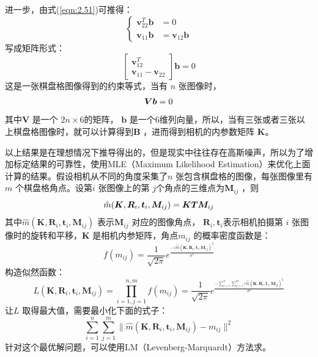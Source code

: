 进一步，由式(\ref{eqn:2.51})可推得：
\begin{equation}
\label{eqn:2.59}
\left\{
\begin{aligned} 
\bm{v}_{22}^T \bm{b} &= 0 \\ 
\bm{v}_{11} \bm{b} &= \bm{v}_{12} \bm{b} 
\end{aligned}
\right.
\end{equation}
写成矩阵形式：
\begin{equation}
\label{eqn:2.60}
\left[ 
\begin{array}{c} \bm{v}_{12}^T \\ \bm{v}_{11}-\bm{v}_{22} \end{array}
\right] \bm{b}  = 0
\end{equation}
这是一张棋盘格图像得到的约束等式，当有 $n$  张图像时，
\begin{equation}
\label{eqn:2.61}
\setlength{\abovedisplayskip}{6pt}
\setlength{\belowdisplayskip}{6pt}
\bm{Vb} = 0
\end{equation}
其中$\bm{V} $ 是一个 $2n \times 6 $的矩阵， $\bm{b} $ 是一个6维列向量，所以，当有三张或者三张以上棋盘格图像时，就可以计算得到$\bm{B} $ ，进而得到相机的内参数矩阵 $\bm{K} $。

以上结果是在理想情况下推导得出的，但是现实中往往存在高斯噪声，所以为了增加标定结果的可靠性，使用MLE（Maximum Likelihood Estimation）来优化上面计算的结果。假设相机从不同的角度采集了$n$ 张包含棋盘格的图像，每张图像里有$m$ 个棋盘格角点。设第$i$ 张图像上的第 $j$个角点的三维点为$\bm{M}_{ij} $ ，则	
\begin{equation}
\label{eqn:2.62}
\setlength{\abovedisplayskip}{6pt}
\setlength{\belowdisplayskip}{6pt}
\hat{m}( \bm{K},\bm{R}_i,\bm{t}_i,\bm{M}_{ij}) = \bm{K}\bm{T}\bm{M}_{ij}
\end{equation}
其中$\hat{m}( \bm{K},\bm{R}_i,\bm{t}_i,\bm{M}_{ij} )  $ 表示$\bm{M}_{ij} $ 对应的图像角点， $\bm{R}_i,\bm{t}_i $表示相机拍摄第  $i$ 张图像时的旋转和平移，$\bm{K} $ 是相机内参矩阵，角点$m_{ij} $ 的概率密度函数是：
\begin{equation}
\label{eqn:2.63}
f(m_{ij})=\frac{1}{\sqrt{2\pi}}e^{\frac{-(\hat{m}( \bm{K},\bm{R}_i,\bm{t}_i,\bm{M}_{ij} )^2}{\sigma^2}}
\end{equation}
构造似然函数：
\begin{equation}
\label{eqn:2.64}
L(\bm{K},\bm{R}_i,\bm{t}_i,\bm{M}_{ij}  ) = \prod^{n,m}_{i=1,j=1}f(m_{ij})=\frac{1}{\sqrt{2\pi}}e^{\frac{-\sum^n_{i=1}\sum^m_{j=1}(\hat{m}( \bm{K},\bm{R}_i,\bm{t}_i,\bm{M}_{ij} )^2}{\sigma^2}}
\end{equation}
让$L $ 取得最大值，需要最小化下面的式子：
\begin{equation}
\label{eqn:2.65}
\sum^n_{i=1}\sum^m_{j=1} \| \hat{m}( \bm{K},\bm{R}_i,\bm{t}_i,\bm{M}_{ij} )-m_{ij} \|^2
\end{equation}
针对这个最优解问题，可以使用LM（Levenberg-Marquardt）方法求。

